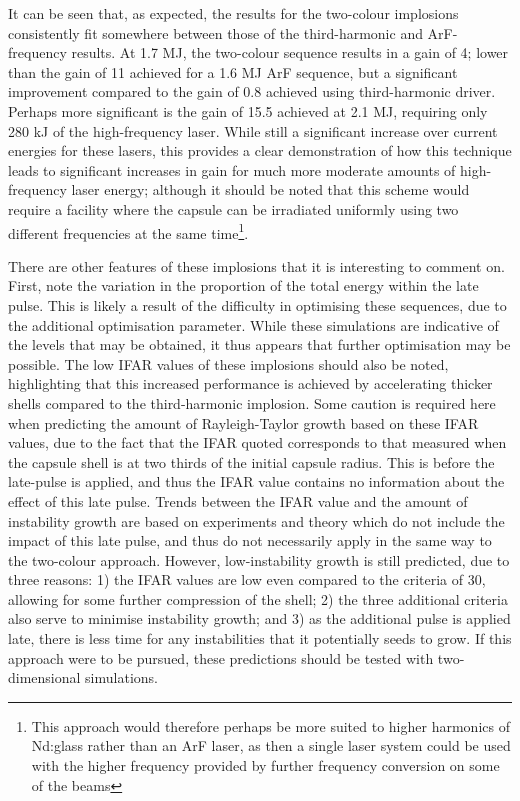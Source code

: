 It can be seen that, as expected, the results for the two-colour implosions consistently fit somewhere between those of the third-harmonic and ArF-frequency results. At 1.7 MJ, the two-colour sequence results in a gain of 4; lower than the gain of 11 achieved for a 1.6 MJ ArF sequence, but a significant improvement compared to the gain of 0.8 achieved using third-harmonic driver. Perhaps more significant is the gain of 15.5 achieved at 2.1 MJ, requiring only 280 kJ of the high-frequency laser. While still a significant increase over current energies for these lasers, this provides a clear demonstration of how this technique leads to significant increases in gain for much more moderate amounts of high-frequency laser energy; although it should be noted that this scheme would require a facility where the capsule can be irradiated uniformly using two different frequencies at the same time\footnote{This approach would therefore perhaps be more suited to higher harmonics of Nd:glass rather than an ArF laser, as then a single laser system could be used with the higher frequency provided by further frequency conversion on some of the beams}.

There are other features of these implosions that it is interesting to comment on. First, note the variation in the proportion of the total energy within the late pulse. This is likely a result of the difficulty in optimising these sequences, due to the additional optimisation parameter. While these simulations are indicative of the levels that may be obtained, it thus appears that further optimisation may be possible. The low IFAR values of these implosions should also be noted, highlighting that this increased performance is achieved by accelerating thicker shells compared to the third-harmonic implosion. Some caution is required here when predicting the amount of Rayleigh-Taylor growth based on these IFAR values, due to the fact that the IFAR quoted corresponds to that measured when the capsule shell is at two thirds of the initial capsule radius. This is before the late-pulse is applied, and thus the IFAR value contains no information about the effect of this late pulse. Trends between the IFAR value and the amount of instability growth are based on experiments and theory which do not include the impact of this late pulse, and thus do not necessarily apply in the same way to the two-colour approach. However, low-instability growth is still predicted, due to three reasons: 1) the IFAR values are low even compared to the criteria of 30, allowing for some further compression of the shell; 2) the three additional criteria also serve to minimise instability growth; and 3) as the additional pulse is applied late, there is less time for any instabilities that it potentially seeds to grow. If this approach were to be pursued, these predictions should be tested with two-dimensional simulations.

